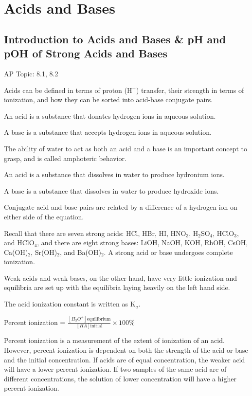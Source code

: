 \documentclass[../chem.tex]{subfiles}
\begin{document}
\chapter{Acids and Bases}
\section{Introduction to Acids and Bases \& pH and pOH of Strong Acids and Bases}
AP Topic: 8.1, 8.2

Acids can be defined in terms of proton (H$^+$) transfer, their strength in terms of ionization, and how they can be sorted into acid-base conjugate pairs.

An acid is a substance that donates hydrogen ions in aqueous solution.

A base is a substance that accepts hydrogen ions in aqueous solution.

The ability of water to act as both an acid and a base is an important concept to grasp, and is called amphoteric behavior.

An acid is a substance that dissolves in water to produce hydronium ions.

A base is a substance that dissolves in water to produce hydroxide ions.

Conjugate acid and base pairs are related by a difference of a hydrogen ion on either side of the equation. 

Recall that there are seven strong acids: HCl, HBr, HI, HNO$_3$, H$_2$SO$_4$, HClO$_3$, and HClO$_4$, and there are eight strong bases: 
LiOH, NaOH, KOH, RbOH, CsOH, Ca(OH)$_2$, Sr(OH)$_2$, and Ba(OH)$_2$. A strong acid or base undergoes complete ionization.

Weak acids and weak bases, on the other hand, have very little ionization and equilibria are set up with the equilibria laying heavily on the left hand side.

The acid ionization constant is written as K$_a$.
\begin{center}
    Percent ionization = $\frac{[H_3O^+]\text{equilibrium}}{[HA]\text{initial}}\times 100\%$
\end{center}

Percent ionization is a measurement of the extent of ionization of an acid. However, percent ionization is dependent on both the strength 
of the acid or base and the initial concentration. If acids are of equal concentration, the weaker acid will have a lower percent ionization. If two samples of the same acid 
are of different concentrations, the solution of lower concentration will have a higher percent ionization.
\end{document}

